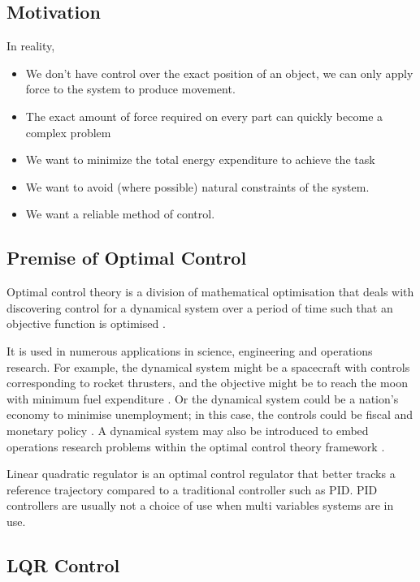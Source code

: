 \documentclass{UoNMCHA}
\numberwithin{equation}{section}
\begin{document}
	\subsection{Motivation}
	
	In reality,
	\begin{itemize}
		\item We don’t have control over the exact position of an object, we can only apply force to the system to produce movement. 
		\item The exact amount of force required on every part can quickly become a complex problem 
		\item We want to minimize the total energy expenditure to achieve the task 
		\item We want to avoid (where possible) natural constraints of the system. 
		\item We want a reliable method of control. 	
	\end{itemize}
	
		\subsection{Premise of Optimal Control}
	
	Optimal control theory is a division of mathematical optimisation that deals with discovering control for a dynamical system over a period of time such that an objective function is optimised \cite{imichaelross_2015_a}. \par
	
	It is used in numerous applications in science, engineering and operations research. For example, the dynamical system might be a spacecraft with controls corresponding to rocket thrusters, and the objective might be to reach the moon with minimum fuel expenditure \cite{luenberger_1979_introduction}. Or the dynamical system could be a nation's economy to minimise unemployment; in this case, the controls could be fiscal and monetary policy \cite{kamien_2012_dynamic}. A dynamical system may also be introduced to embed operations research problems within the optimal control theory framework \cite{ross_2016_a}. \par
	
	Linear quadratic regulator is an optimal control regulator that better tracks a reference trajectory compared to a traditional controller such as PID. PID controllers are usually not a choice of use when multi variables systems are in use. 
	
	
	\subsection{LQR Control}
	
\end{document}
